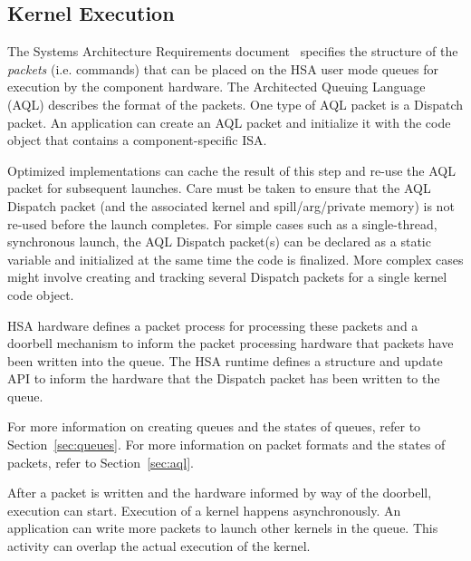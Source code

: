 \documentclass[final]{book}
\begin{document}
\subsection{Kernel Execution}
The Systems Architecture Requirements document~\cite{sar} specifies the
structure of the \emph{packets} (i.e. commands) that can be placed on the HSA
user mode queues for execution by the component hardware. The Architected
Queuing Language (AQL) describes the format of the packets. One type of
AQL packet is a Dispatch packet. An application can create an AQL packet
and initialize it with the code object that contains a component-specific ISA.

Optimized implementations can cache the result of this step and re-use the AQL
packet for subsequent launches. Care must be taken to ensure that the AQL
Dispatch packet (and the associated kernel and spill/arg/private memory) is not
re-used before the launch completes. For simple cases such as a
single-thread, synchronous launch, the AQL Dispatch packet(s) can be declared
as a static variable and initialized at the same time the code is
finalized. More complex cases might involve creating and tracking several
Dispatch packets for a single kernel code object.

HSA hardware defines a packet process for processing these packets and a
doorbell mechanism to inform the packet processing hardware that packets have
been written into the queue. The HSA runtime defines a structure and update API
to inform the hardware that the Dispatch packet has been written to the queue.

For more information on creating queues and the states of queues, refer to
Section~\ref{sec:queues}. For more information on packet formats and the states
of packets, refer to Section~\ref{sec:aql}.

After a packet is written and the hardware informed by way of the doorbell,
execution can start. Execution of a kernel happens asynchronously. An application
can write more packets to launch other kernels in the queue. This activity can
overlap the actual execution of the kernel.
\end{document}

